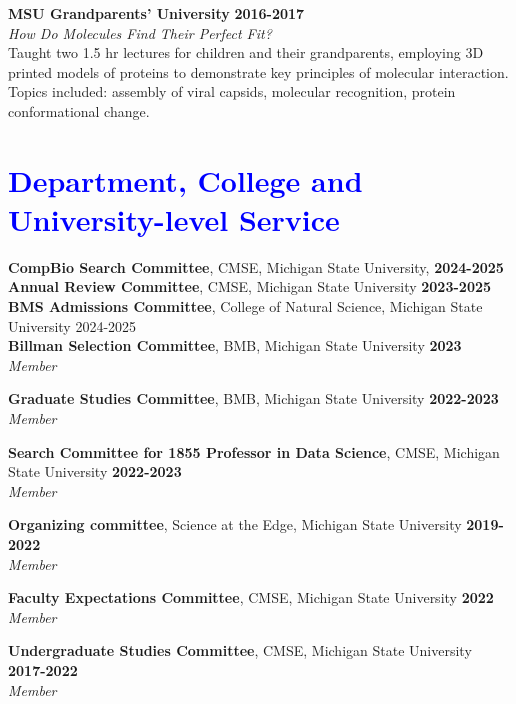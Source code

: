 \documentclass[margin,line]{res}
\begin{document}
\begin{resume}
        {\bf MSU Grandparents' University} \hfill {\bf 2016-2017} \\
        \emph{How Do Molecules Find Their Perfect Fit?}\\
        Taught two 1.5 hr lectures for children and their grandparents, employing 3D printed models of proteins to demonstrate key principles of molecular interaction.  Topics included: assembly of viral capsids, molecular recognition, protein conformational change.

\section{\sc \textcolor{blue}{ Department, College and \\ University-level Service }}

{\bf CompBio Search Committee}, CMSE, Michigan State University, \hfill {\bf 2024-2025}\\

{\bf Annual Review Committee}, CMSE, Michigan State University \hfill {\bf 2023-2025}\\

{\bf BMS Admissions Committee}, College of Natural Science, Michigan State University \hfill {2024-2025}\\

{\bf Billman Selection Committee}, BMB, Michigan State University \hfill {\bf 2023}\\
        {\emph {Member}}

        {\bf Graduate Studies Committee}, BMB, Michigan State University \hfill {\bf 2022-2023}\\
        {\emph {Member}}

        {\bf Search Committee for 1855 Professor in Data Science}, CMSE, Michigan State University \hfill {\bf 2022-2023}\\
        {\emph {Member}}

        {\bf Organizing committee}, Science at the Edge, Michigan State University \hfill {\bf 2019-2022}\\
        {\emph {Member}}
        
        {\bf Faculty Expectations Committee}, CMSE, Michigan State University \hfill {\bf 2022}\\
        {\emph {Member}}
        
        {\bf Undergraduate Studies Committee}, CMSE, Michigan State University \hfill {\bf 2017-2022}\\
        {\emph {Member}}
        

\end{resume}
\end{document}
